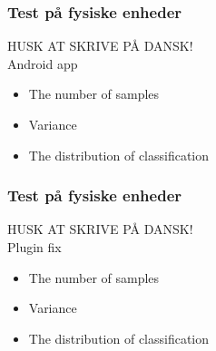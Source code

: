 \begin{frame}
    \frametitle{Test på fysiske enheder}
    HUSK AT SKRIVE PÅ DANSK!\\
    Android app
    \begin{itemize}
        \item The number of samples
        \item Variance
        \item The distribution of classification
    \end{itemize}
\end{frame}

\begin{frame}
    \frametitle{Test på fysiske enheder}
    HUSK AT SKRIVE PÅ DANSK!\\
    Plugin fix
    \begin{itemize}
        \item The number of samples
        \item Variance
        \item The distribution of classification
    \end{itemize}
\end{frame}
